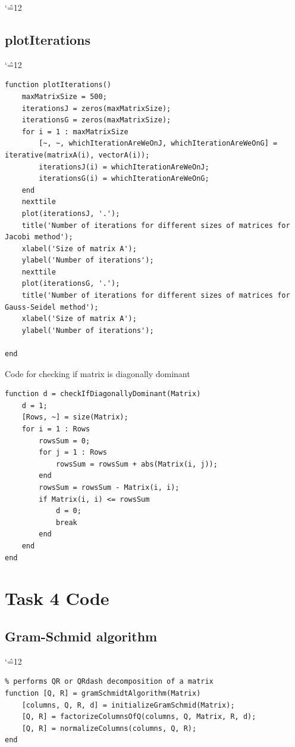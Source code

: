 \documentclass[12pt]{report}
\newenvironment{simplechar}{%
   \catcode`\^=12
}{}
\begin{document}
\begin{simplechar}
\newpage
\hypertarget{function_3_plot}{\subsection{plotIterations}}
\begin{simplechar}
\begin{lstlisting}
function plotIterations()
    maxMatrixSize = 500;
    iterationsJ = zeros(maxMatrixSize);
    iterationsG = zeros(maxMatrixSize);
    for i = 1 : maxMatrixSize
        [~, ~, whichIterationAreWeOnJ, whichIterationAreWeOnG] = iterative(matrixA(i), vectorA(i));
        iterationsJ(i) = whichIterationAreWeOnJ;
        iterationsG(i) = whichIterationAreWeOnG;
    end
    nexttile
    plot(iterationsJ, '.');
    title('Number of iterations for different sizes of matrices for Jacobi method');
    xlabel('Size of matrix A');
    ylabel('Number of iterations');
    nexttile
    plot(iterationsG, '.');
    title('Number of iterations for different sizes of matrices for Gauss-Seidel method');
    xlabel('Size of matrix A');
    ylabel('Number of iterations');

end
\end{lstlisting}
\end{simplechar}

\hypertarget{function_3_dominant}{Code for checking if matrix is diagonally dominant}
\begin{lstlisting}
function d = checkIfDiagonallyDominant(Matrix)
    d = 1;
    [Rows, ~] = size(Matrix);
    for i = 1 : Rows
        rowsSum = 0;
        for j = 1 : Rows
            rowsSum = rowsSum + abs(Matrix(i, j));
        end
        rowsSum = rowsSum - Matrix(i, i);
        if Matrix(i, i) <= rowsSum
            d = 0;
            break
        end
    end
end
\end{lstlisting}
\end{simplechar}


\newpage
\section{Task 4 Code}
\subsection{Gram-Schmid algorithm}

\begin{simplechar}
\begin{lstlisting}
% performs QR or QRdash decomposition of a matrix
function [Q, R] = gramSchmidtAlgorithm(Matrix)
    [columns, Q, R, d] = initializeGramSchmid(Matrix);
    [Q, R] = factorizeColumnsOfQ(columns, Q, Matrix, R, d);
    [Q, R] = normalizeColumns(columns, Q, R);
end
\end{lstlisting}
\end{simplechar}
\end{document}
